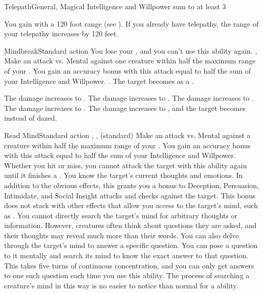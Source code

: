   \begin{magicalfeat}{Telepath}{General, Magical}
    \featpre Intelligence and Willpower sum to at least 3

     You gain  with a 120 foot range (see ).
    If you already have telepathy, the range of your telepathy increases by 120 feet.

    \begin{magicalactiveability}{Mindbreak}{Standard action}
      \abilitycost You \briefly lose your , and you \briefly can't use this ability again.
      \abilitytags {}, 
      \rankline
      Make an attack vs. Mental against one creature within half the maximum range of your .
      You gain an accuracy bonus with this attack equal to half the sum of your Intelligence and Willpower.
      \hit \damageranktwo.
      \injury The target becomes \dazed as a .

      \rankline
       The damage increases to \damagerankthree.
       The damage increases to \damagerankfour.
       The damage increases to \damagerankfive.
       The damage increases to \damageranksix.
       The damage increases to \damagerankseven, and the target becomes \confused instead of dazed.
    \end{magicalactiveability}

    \begin{magicalsustainability}{Read Mind}{Standard action}
      \abilitytags {}, ,  (standard)
      \rankline
      Make an attack vs. Mental against a creature within half the maximum range of your .
      You gain an accuracy bonus with this attack equal to half the sum of your Intelligence and Willpower.
      Whether you hit or miss, you cannot attack the target with this ability again until it finishes a .
      \hit You know the target's current thoughts and emotions.
      In addition to the obvious effects, this grants you a  bonus to Deception, Persuasion, Intimidate, and Social Insight attacks and checks against the target.
      This bonus does not stack with other effects that allow you access to the target's mind, such as .
      You cannot directly search the target's mind for arbitrary thoughts or information.
      However, creatures often think about questions they are asked, and their thoughts may reveal much more than their words.
      \crit You can also delve through the target's mind to answer a specific question.
      You can pose a question to it mentally and search its mind to know the exact answer to that question.
      This takes five turns of continuous concentration, and you can only get answers to one such question each time you use this ability.
      The process of searching a creature's mind in this way is no easier to notice than normal for a  ability.


\end{magicalsustainability}
\end{magicalfeat}
